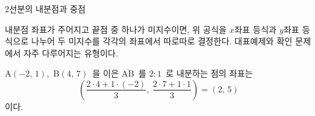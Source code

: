 \documentclass[10pt]{article}
\begin{document}
\begin{dmconcept}{2}{선분의 내분점과 중점}
\begin{dmexplain}
내분점 좌표가 주어지고 끝점 중 하나가 미지수이면, 위 공식을 $x$좌표 등식과 $y$좌표 등식으로 나누어 두 미지수를 각각의 좌표에서 따로따로 결정한다. 대표예제와 확인 문제에서 자주 다루어지는 유형이다.
\end{dmexplain}

\begin{dmexample}
$\mathrm{A}(-2,\, 1)$,\ $\mathrm{B}(4,\, 7)$\ 을 이은 $\overline{\mathrm{AB}}$\ 를 $2 : 1$\ 로 내분하는 점의 좌표는
\begin{equation*}
  \left( \dfrac{2 \cdot 4 + 1 \cdot (-2)}{3},\ \dfrac{2 \cdot 7 + 1 \cdot 1}{3} \right) = (2,\, 5)
\end{equation*}
이다.
\end{dmexample}

\end{dmconcept}

\newpage

\dmconcepthead
{}
\end{document}
